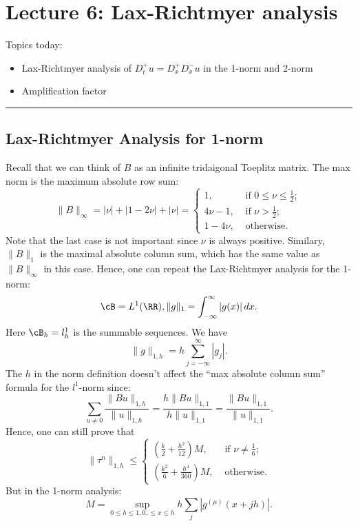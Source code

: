 \newpage
\section{Lecture 6:  Lax-Richtmyer analysis} 

Topics today: 
\begin{itemize}
    \item Lax-Richtmyer analysis of $D_t^+ u = D_x^+ D_x^- u$ in the 1-norm and 2-norm 
    \item Amplification factor  
\end{itemize}

\vspace{1em}
\hrule 
\vspace{1em} 

\subsection{Lax-Richtmyer Analysis for 1-norm} 
Recall that we can think of $B$ as an infinite tridaigonal Toeplitz matrix.  The max norm is the maximum absolute row sum: 
\[
    \|B\|_\infty = |\nu| + |1-2\nu| + |\nu| = \begin{cases}
        1, &\text{ if } 0\le \nu \le \frac{1}{2} ;\\
        4\nu -1, &\text{ if } \nu >\frac{1}{2} ;\\
        1-4\nu, &\text{ otherwise} .
    \end{cases}
\]
Note that the last case is not important since $\nu$ is always positive. Similary, $\|B\|_1$ is the maximal absolute column sum, which has the same value as $\|B\|_\infty$ in this case.  Hence, one can repeat the Lax-Richtmyer analysis for the 1-norm: 
\[
    \cB = L^1(\RR), \|g\|_1 = \int_{-\infty}^\infty |g(x)| \, dx. 
\]
Here $\cB_h = l_h^1$ is the summable sequences.  We have 
\[
    \|g\|_{1,h} = h \sum_{j=-\infty}^{\infty} |g_j|.  
\]
The $h$ in the norm definition doesn't affect the ``max absolute column sum'' formula for the $l^1$-norm since: 
\[
    \sum_{ u\neq 0 } \frac{\|Bu\|_{1,h}}{\|u\|_{ 1,h } } = \frac{h\|Bu\|_{ 1,1 } }{h\|u\|_{1,1}} = \frac{\|Bu\|_{1,1}}{\|u\|_{1,1}}.  
\]
Hence, one can still prove that 
\[
    \|\tau^n \|_{1,h} \le \begin{cases}
        \left( \frac{k}{2}+ \frac{h^2}{12}\right) M, &\text{ if } \nu \neq \frac{1}{6} ;\\
        \left( \frac{k^2}{6}+ \frac{h^4}{360} \right) M, &\text{ otherwise} .
    \end{cases}
\]
But in the 1-norm analysis: 
\[
    M = \sup_{0\le h\le 1, 0,\le x\le h} h \sum_{j} |g^{(\mu)} (x+jh)|.  
\]

